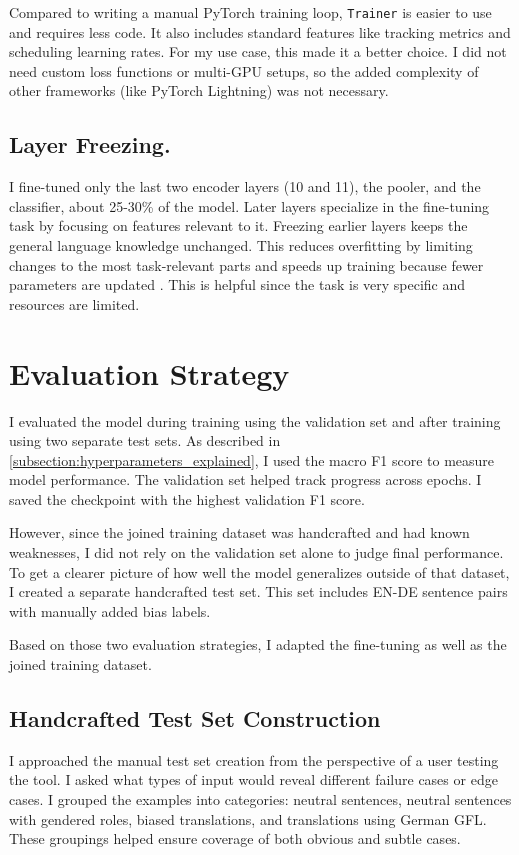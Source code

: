     Compared to writing a manual PyTorch training loop, \texttt{Trainer} is easier to use and requires less code. It also includes standard features like tracking metrics and scheduling learning rates. For my use case, this made it a better choice. I did not need custom loss functions or multi-GPU setups, so the added complexity of other frameworks (like PyTorch Lightning) was not necessary.

    \subsection{Layer Freezing.}
    I fine-tuned only the last two encoder layers (10 and 11), the pooler, and the classifier, about 25-30\% of the model. Later layers specialize in the fine-tuning task by focusing on features relevant to it. Freezing earlier layers keeps the general language knowledge unchanged. This reduces overfitting by limiting changes to the most task-relevant parts and speeds up training because fewer parameters are updated \parencite{nadipalliLayerWiseEvolutionRepresentations2025}. This is helpful since the task is very specific and resources are limited.

\section{Evaluation Strategy}
    I evaluated the model during training using the validation set and after training using two separate test sets. As described in \autoref{subsection:hyperparameters_explained}, I used the macro F1 score to measure model performance. The validation set helped track progress across epochs. I saved the checkpoint with the highest validation F1 score.

    However, since the joined training dataset was handcrafted and had known weaknesses, I did not rely on the validation set alone to judge final performance. To get a clearer picture of how well the model generalizes outside of that dataset, I created a separate handcrafted test set. This set includes EN-DE sentence pairs with manually added bias labels.
    
    Based on those two evaluation strategies, I adapted the fine-tuning as well as the joined training dataset. 

\subsection{Handcrafted Test Set Construction} \label{subsection:eval_dataset}
    I approached the manual test set creation from the perspective of a user testing the tool. I asked what types of input would reveal different failure cases or edge cases. I grouped the examples into categories: neutral sentences, neutral sentences with gendered roles, biased translations, and translations using German GFL. These groupings helped ensure coverage of both obvious and subtle cases.

